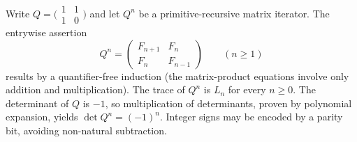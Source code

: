 \documentclass[11pt]{article}
\begin{document}
Write $Q=\bigl(\begin{smallmatrix}1&1\\1&0\end{smallmatrix}\bigr)$ and let $Q^n$ be a primitive-recursive matrix iterator. The entrywise assertion
\[ Q^n=\begin{pmatrix}F_{n+1}&F_n\\F_n&F_{n-1}\end{pmatrix}\qquad(n\ge1)\tag{M}\]
results by a quantifier-free induction (the matrix-product equations involve only addition and multiplication). The trace of $Q^n$ is $L_n$ for every $n\ge0$. The determinant of $Q$ is $-1$, so multiplication of determinants, proven by polynomial expansion, yields $\det Q^n=(-1)^n$. Integer signs may be encoded by a parity bit, avoiding non-natural subtraction.
\end{document}
